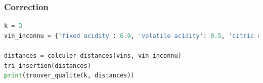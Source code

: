 \documentclass[svgnames,11pt]{beamer}
\begin{document}
\begin{frame}[fragile]
    \frametitle{Correction}
\begin{center}
\begin{lstlisting}[language=Python , basicstyle=\ttfamily\small, xleftmargin=0.2em, xrightmargin=0em]
k = 3
vin_inconnu = {'fixed acidity': 6.9, 'volatile acidity': 0.5, 'citric acid': 0.19, 'residual sugar': 3.9, 'chlorides': 0.16, 'free sulfur dioxide': 31.0, 'total sulfur dioxide': 50.0, 'density': 0.994, 'pH': 3.01, 'sulphates': 0.61, 'alcohol': 9.3}

distances = calculer_distances(vins, vin_inconnu)
tri_insertion(distances)
print(trouver_qualite(k, distances))
\end{lstlisting}
\end{center}
    

\end{frame}
\end{document}

